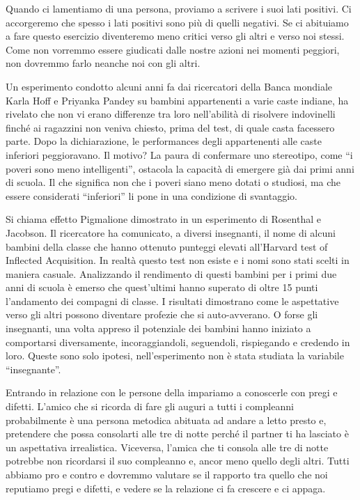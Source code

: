 \documentclass[12pt]{book} %
\begin{document}
Quando ci lamentiamo di una persona, proviamo a scrivere i suoi lati positivi. Ci accorgeremo che spesso i lati positivi
sono più di quelli negativi. Se ci abituiamo a fare questo esercizio diventeremo meno critici verso gli altri e verso
noi stessi. Come non vorremmo essere giudicati dalle nostre azioni nei momenti peggiori, non dovremmo farlo neanche noi
con gli altri.

Un esperimento condotto alcuni anni fa dai ricercatori della Banca mondiale Karla Hoff e Priyanka Pandey su bambini
appartenenti a varie caste indiane, ha rivelato che non vi erano differenze tra loro nell'abilità di risolvere
indovinelli finché ai ragazzini non veniva chiesto, prima del test, di quale casta facessero parte. Dopo la
dichiarazione, le performances degli appartenenti alle caste inferiori peggioravano. Il motivo? La paura di confermare
uno stereotipo, come “i poveri sono meno intelligenti”, ostacola la capacità di emergere già dai primi anni di scuola.
Il che significa non che i poveri siano meno dotati o studiosi, ma che essere considerati “inferiori” li pone in una
condizione di svantaggio. 

Si chiama effetto Pigmalione dimostrato in un esperimento di Rosenthal e Jacobson. Il ricercatore ha comunicato, a
diversi insegnanti, il nome di alcuni bambini della classe che hanno ottenuto punteggi elevati
all'Harvard test of Inflected Acquisition. In realtà questo test non esiste e i nomi sono stati
scelti in maniera casuale. Analizzando il rendimento di questi bambini per i primi due anni di scuola è emerso che
quest'ultimi hanno superato di oltre 15 punti l'andamento dei compagni di
classe. I risultati dimostrano come le aspettative verso gli altri possono diventare profezie che si auto-avverano. O
forse gli insegnanti, una volta appreso il potenziale dei bambini hanno iniziato a comportarsi diversamente,
incoraggiandoli, seguendoli, rispiegando e credendo in loro. Queste sono solo ipotesi,
nell'esperimento non è stata studiata la variabile “insegnante”.

Entrando in relazione con le persone della impariamo a conoscerle con pregi e difetti.
L'amico che si ricorda di fare gli auguri a tutti i compleanni probabilmente è una persona
metodica abituata ad andare a letto presto e, pretendere che possa consolarti alle tre di notte perché il partner ti ha
lasciato è un aspettativa irrealistica. Viceversa, l'amica che ti consola alle tre di notte
potrebbe non ricordarsi il suo compleanno e, ancor meno quello degli altri. Tutti abbiamo pro e contro e dovremmo
valutare se il rapporto tra quello che noi reputiamo pregi e difetti, e vedere se la relazione ci fa crescere e ci
appaga.
\end{document}
